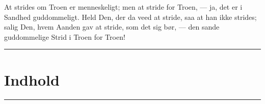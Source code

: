 \documentclass[12pt,a4paper]{book}
\begin{document}
At strides om Troen er menneskeligt; men at stride for Troen, --- ja, det er
i Sandhed guddommeligt. Held Den, der da veed at stride, saa at han ikke
strides; salig Den, hvem Aanden gav at stride, som det sig bør, --- den sande
guddommelige Strid i Troen for Troen!

\endgroup

\begin{center}
\rule{0.22\textwidth}{0.4pt}
\end{center}

%
%
%
\backmatter
\chapter*{Indhold}

\begin{center}
\rule{0.12\textwidth}{0.4pt}
\end{center}

\newcommand{\indpost}[2]{%
  \par\medskip
  \begin{center}\bfseries #1\end{center}
  \par\nobreak\noindent #2\par}
\end{document}
